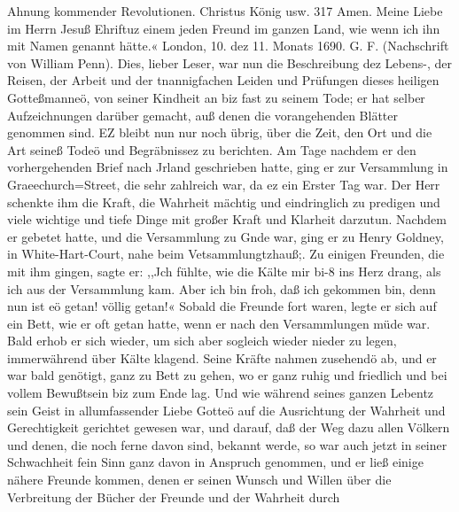 Ahnung kommender Revolutionen. Christus König usw. 317
Amen. Meine Liebe im Herrn Jesuß Ehriftuz einem jeden Freund
im ganzen Land, wie wenn ich ihn mit Namen genannt hätte.«
London, 10. dez 11. Monats 1690. G. F.
(Nachschrift von William Penn).
Dies, lieber Leser, war nun die Beschreibung dez Lebens-,
der Reisen, der Arbeit und der tnannigfachen Leiden und Prüfungen
dieses heiligen Gotteßmanneö, von seiner Kindheit an biz fast zu
seinem Tode; er hat selber Aufzeichnungen darüber gemacht, auß
denen die vorangehenden Blätter genommen sind. EZ bleibt nun
nur noch übrig, über die Zeit, den Ort und die Art seineß Todeö
und Begräbnissez zu berichten.
Am Tage nachdem er den vorhergehenden Brief nach Jrland
geschrieben hatte, ging er zur Versammlung in Graeechurch=Street,
die sehr zahlreich war, da ez ein Erster Tag war. Der Herr
schenkte ihm die Kraft, die Wahrheit mächtig und eindringlich zu
predigen und viele wichtige und tiefe Dinge mit großer Kraft und
Klarheit darzutun. Nachdem er gebetet hatte, und die Versammlung
zu Gnde war, ging er zu Henry Goldney, in White-Hart-Court,
nahe beim Vetsammlungtzhauß;. Zu einigen Freunden, die mit
ihm gingen, sagte er: ,,Jch fühlte, wie die Kälte mir bi-8 ins
Herz drang, als ich aus der Versammlung kam. Aber ich bin
froh, daß ich gekommen bin, denn nun ist eö getan! völlig getan!«
Sobald die Freunde fort waren, legte er sich auf ein Bett, wie
er oft getan hatte, wenn er nach den Versammlungen müde war.
Bald erhob er sich wieder, um sich aber sogleich wieder nieder
zu legen, immerwährend über Kälte klagend. Seine Kräfte nahmen
zusehendö ab, und er war bald genötigt, ganz zu Bett zu gehen,
wo er ganz ruhig und friedlich und bei vollem Bewußtsein biz
zum Ende lag. Und wie während seines ganzen Lebentz sein
Geist in allumfassender Liebe Gotteö auf die Ausrichtung der
Wahrheit und Gerechtigkeit gerichtet gewesen war, und darauf,
daß der Weg dazu allen Völkern und denen, die noch ferne davon
sind, bekannt werde, so war auch jetzt in seiner Schwachheit fein
Sinn ganz davon in Anspruch genommen, und er ließ einige
nähere Freunde kommen, denen er seinen Wunsch und Willen über
die Verbreitung der Bücher der Freunde und der Wahrheit durch


